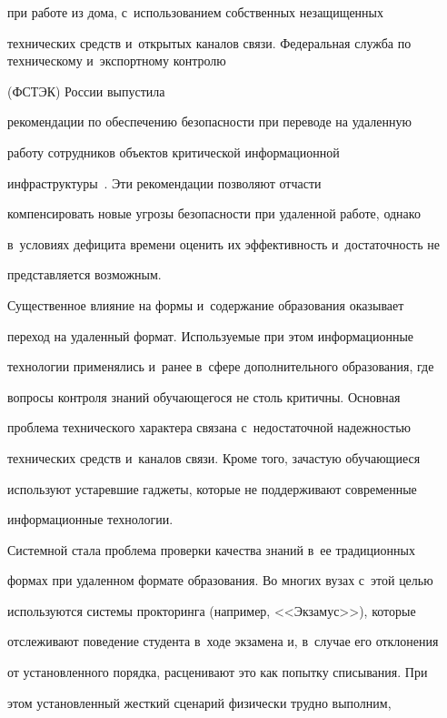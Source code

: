 при работе из дома, с~использованием собственных незащищенных 


технических средств и~открытых каналов связи. Федеральная служба по техническому и~экспортному контролю


(ФСТЭК) России выпустила 


рекомендации по обеспечению безопасности при переводе на удаленную 


работу сотрудников объектов критической информационной 


инфраструктуры~\cite{7-zts, 8-zts}. Эти рекомендации позволяют отчасти 


компенсировать новые угрозы безопасности при удаленной работе, однако 


в~условиях дефицита времени оценить их эффективность и~достаточность не 


представляется возможным.


   


   Существенное влияние на формы и~содержание образования оказывает 


переход на удаленный формат. Используемые при этом информационные 


технологии применялись и~ранее в~сфере дополнительного образования, где 


вопросы контроля знаний обучающегося не столь критичны. Основная 


проблема технического характера связана с~недостаточной надежностью 


технических средств и~каналов связи. Кроме того, зачастую обучающиеся 


используют устаревшие гаджеты, которые не поддерживают современные 


информационные технологии.


   


   Системной стала проблема проверки качества знаний в~ее традиционных 


формах при удаленном формате образования. Во многих вузах с~этой целью 


используются системы прокторинга (например, <<Экзамус>>), которые 


отслеживают поведение студента в~ходе экзамена и, в~случае его отклонения 


от установленного порядка, расценивают это как попытку списывания. При 


этом установленный жесткий сценарий физически трудно выполним, 


